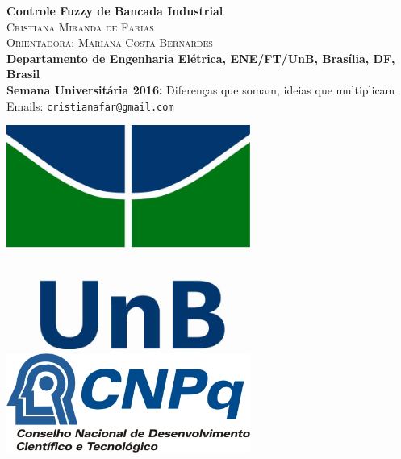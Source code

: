 \documentclass[a0,portrait]{a0poster}
\begin{document}
\begin{minipage}[b]{0.75\linewidth}
{\centering
\fontsize{80}{120} \color{NavyBlue} \textbf{Controle Fuzzy de Bancada Industrial} \color{Black}\\[1.5cm] %

\huge \textsc{Cristiana Miranda de Farias}\\[0.5cm] %
\huge \textsc{Orientadora: Mariana Costa Bernardes}\\[0.5cm]

\Large{\bf Departamento de Engenharia Elétrica, ENE/FT/UnB, Brasília, DF, Brasil}\\[0.5cm]
\Large{\bf Semana Universitária 2016: }
\large{Diferenças que somam, ideias que multiplicam}\\[0.5cm]
\Large Emails: \texttt{cristianafar@gmail.com}\\
}
\end{minipage}
%
\begin{minipage}[b]{0.12\linewidth}
\includegraphics[width=8cm]{imgs/logo.png} \vspace{3cm}\\
\includegraphics[width=8cm]{imgs/cnpq.jpg}\\
\end{minipage}
\end{document}
